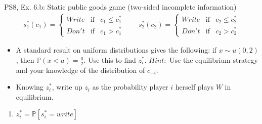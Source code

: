 \begin{frame}{PS8, Ex. 6.b: Static public goods game (two-sided incomplete information)}
    \begin{align*}
      s_1^*(c_1)=\left\{\begin{array}{rcl}
        Write & \text{if} & c_1\leq c_1^*\\
        Don't & \text{if} & c_1>c_1^*
        \end{array}\right.\quad\quad
      s_2^*(c_2)=\left\{\begin{array}{rcl}
        Write & \text{if} & c_2\leq c_2^*\\
        Don't & \text{if} & c_2>c_2^*
        \end{array}\right.
    \end{align*}
    \vspace{-12pt}
    \begin{itemize}
      \item[(b)] A standard result on uniform distributions gives the following: if $x\sim u(0, 2)$, then $\mathbb{P}(x<a)=\frac{a}{2}$. Use this to find $z_i^*$. $Hint:$ Use the equilibrium strategy and your knowledge of the distribution of $c_{-i}$.
    \end{itemize}
    \begin{multicols}{2}
      \begin{itemize}
        \item[Step 1:] Knowing $z_i^*$, write up $z_i$ as the probability player $i$ herself plays $W$ in equilibrium.
      \end{itemize}
      \vfill\null\columnbreak
      \begin{enumerate}
        \item $z_i^*=\mathbb{P}[s_i^*=write]$
      \end{enumerate}
      \vfill\null
    \end{multicols}
\end{frame}
